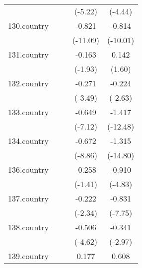 {\begin{tabular}{l*{4}{c}}
            &                     &                     &     (-5.22)         &     (-4.44)         \\
[1em]
130.country &                     &                     &      -0.821\sym{***}&      -0.814\sym{***}\\
            &                     &                     &    (-11.09)         &    (-10.01)         \\
[1em]
131.country &                     &                     &      -0.163         &       0.142         \\
            &                     &                     &     (-1.93)         &      (1.60)         \\
[1em]
132.country &                     &                     &      -0.271\sym{***}&      -0.224\sym{**} \\
            &                     &                     &     (-3.49)         &     (-2.63)         \\
[1em]
133.country &                     &                     &      -0.649\sym{***}&      -1.417\sym{***}\\
            &                     &                     &     (-7.12)         &    (-12.48)         \\
[1em]
134.country &                     &                     &      -0.672\sym{***}&      -1.315\sym{***}\\
            &                     &                     &     (-8.86)         &    (-14.80)         \\
[1em]
136.country &                     &                     &      -0.258         &      -0.910\sym{***}\\
            &                     &                     &     (-1.41)         &     (-4.83)         \\
[1em]
137.country &                     &                     &      -0.222\sym{*}  &      -0.831\sym{***}\\
            &                     &                     &     (-2.34)         &     (-7.75)         \\
[1em]
138.country &                     &                     &      -0.506\sym{***}&      -0.341\sym{**} \\
            &                     &                     &     (-4.62)         &     (-2.97)         \\
[1em]
139.country &                     &                     &       0.177         &       0.608\sym{***}\\

\end{tabular}}
